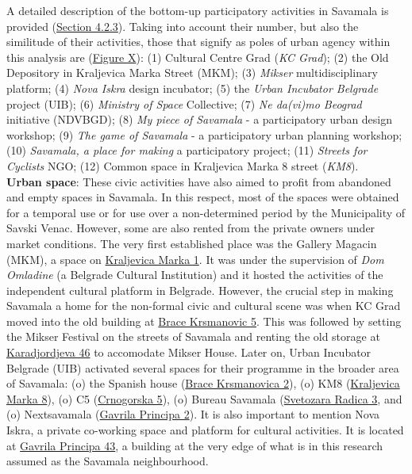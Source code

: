 \documentclass[11pt]{report}
\begin{document}
{{{{\begin{itemize}
A detailed description of the bottom-up participatory activities in Savamala is provided (\href{Section 4.2.3}{Section 4.2.3}).
Taking into account their number, but also the similitude of their activities, those that signify as poles of urban agency within this analysis are (\href{Figure X}{Figure X}): 
(1) Cultural Centre Grad (\textit{KC Grad});
(2) the Old Depository in Kraljevica Marka Street (MKM);
(3) \textit{Mikser} multidisciplinary platform;
(4) \textit{Nova Iskra} design incubator;
(5) the \textit{Urban Incubator Belgrade} project (UIB);
(6) \textit{Ministry of Space} Collective;
(7) \textit{Ne da(vi)mo Beograd} initiative (NDVBGD);
(8) \textit{My piece of Savamala} - a participatory urban design workshop;
(9) \textit{The game of Savamala} - a participatory urban planning workshop;
(10) \textit{Savamala, a place for making} a participatory project;
(11) \textit{Streets for Cyclists} NGO;
(12) Common space in Kraljevica Marka 8 street (\textit{KM8}).
\\

\textbf{Urban space}:
These civic activities have also aimed to profit from abandoned and empty spaces in Savamala. In this respect, most of the spaces were obtained for a temporal use or for use over a non-determined period by the Municipality of Savski Venac. However, some are also rented from the private owners under market conditions. The very first established place was the Gallery Magacin (MKM), a space on \underline{Kraljevica Marka 1}.
It was under the supervision of \textit{Dom Omladine} (a Belgrade Cultural Institution) and it hosted the activities of the independent cultural platform in Belgrade.
However, the crucial step in making Savamala a home for the non-formal civic and cultural scene was when KC Grad moved into the old building at  \underline{Brace Krsmanovic 5}.
This was followed by setting the Mikser Festival on the streets of Savamala and renting the old storage at \underline{Karadjordjeva 46} to accomodate Mikser House. Later on, Urban Incubator Belgrade (UIB) activated several spaces for their programme in the broader area of Savamala:
(o) the Spanish house (\underline{Brace Krsmanovica 2}),
(o) KM8 (\underline{Kraljevica Marka 8}),
(o) C5 (\underline{Crnogorska 5}),
(o) Bureau Savamala (\underline{Svetozara Radica 3},
and
(o) Nextsavamala (\underline{Gavrila Principa 2}). 
It is also important to mention Nova Iskra, a private co-working space and platform for cultural activities. It is located at \underline{Gavrila Principa 43}, a building at the very edge of what is in this research assumed as the Savamala neighbourhood.
\end{itemize}
 
}}}}
\end{document}
